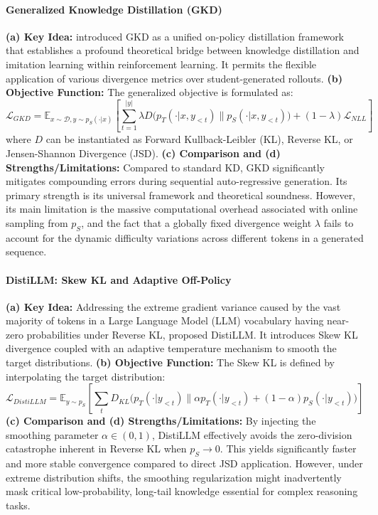 \documentclass{article} %
\begin{document}
\paragraph{Generalized Knowledge Distillation (GKD)}
\textbf{(a) Key Idea:} \citet{2306.13649} introduced GKD as a unified on-policy distillation framework that establishes a profound theoretical bridge between knowledge distillation and imitation learning within reinforcement learning. It permits the flexible application of various divergence metrics over student-generated rollouts.
\textbf{(b) Objective Function:} The generalized objective is formulated as:
\begin{equation}
    \mathcal{L}_{GKD} = \mathbb{E}_{x \sim \mathcal{D}, y \sim p_S(\cdot|x)} \left[ \sum_{t=1}^{|y|} \lambda D\big( p_T(\cdot|x, y_{<t}) \parallel p_S(\cdot|x, y_{<t}) \big) + (1-\lambda) \mathcal{L}_{NLL} \right]
    \label{eq:gkd}
\end{equation}
where $D$ can be instantiated as Forward Kullback-Leibler (KL), Reverse KL, or Jensen-Shannon Divergence (JSD).
\textbf{(c) Comparison and (d) Strengths/Limitations:} Compared to standard KD, GKD significantly mitigates compounding errors during sequential auto-regressive generation. Its primary strength is its universal framework and theoretical soundness. However, its main limitation is the massive computational overhead associated with online sampling from $p_S$, and the fact that a globally fixed divergence weight $\lambda$ fails to account for the dynamic difficulty variations across different tokens in a generated sequence.

\paragraph{DistiLLM: Skew KL and Adaptive Off-Policy}
\textbf{(a) Key Idea:} Addressing the extreme gradient variance caused by the vast majority of tokens in a Large Language Model (LLM) vocabulary having near-zero probabilities under Reverse KL, \citet{2402.03898} proposed DistiLLM. It introduces Skew KL divergence coupled with an adaptive temperature mechanism to smooth the target distributions.
\textbf{(b) Objective Function:} The Skew KL is defined by interpolating the target distribution:
\begin{equation}
    \mathcal{L}_{DistiLLM} = \mathbb{E}_{y \sim p_S} \left[ \sum_t D_{KL}\big(p_T(\cdot|y_{<t}) \parallel \alpha p_T(\cdot|y_{<t}) + (1-\alpha) p_S(\cdot|y_{<t})\big) \right]
    \label{eq:distillm}
\end{equation}
\textbf{(c) Comparison and (d) Strengths/Limitations:} By injecting the smoothing parameter $\alpha \in (0, 1)$, DistiLLM effectively avoids the zero-division catastrophe inherent in Reverse KL when $p_S \to 0$. This yields significantly faster and more stable convergence compared to direct JSD application. However, under extreme distribution shifts, the smoothing regularization might inadvertently mask critical low-probability, long-tail knowledge essential for complex reasoning tasks.
\end{document}
